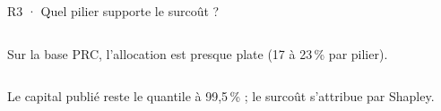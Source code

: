 \documentclass[aspectratio=169,10pt,t]{beamer}
\begin{document}
\begin{frame}[label=reserve-shapley]{R3 · Quel pilier supporte le surcoût ?}
\begin{columns}[T,onlytextwidth]
    Sur la base PRC, l'allocation est presque plate (17 à 23\,\% par pilier).\par
  \end{columns}
  \vspace{.5mm}
  {\centering\scriptsize\color{gris}Le capital publié reste le quantile à 99,5\,\% ; le surcoût s'attribue par Shapley.\par}
\end{frame}

\newcommand{\barreh}[5]{%
  \node[anchor=east,font=\footnotesize,text=encre] at (-2,#1) {#4};
  \fill[#3,rounded corners=.6mm] (0,#1-3) rectangle (#2,#1+3);
  \node[anchor=west,font=\footnotesize\bfseries,text=#3] at (#2+1.5,#1) {#5};}
\newcommand{\reponse}[1]{%
  \vspace{2mm}{\centering\tikz{\node[fill=white,draw=filet,rounded corners=1.2mm,inner xsep=4mm,inner ysep=1.6mm,text width=.84\textwidth,align=center] (m) {\small #1};
  \fill[accent] ([yshift=-.4mm]m.north west) rectangle ([xshift=1.4mm,yshift=.4mm]m.south west);}\par}}
\end{document}
